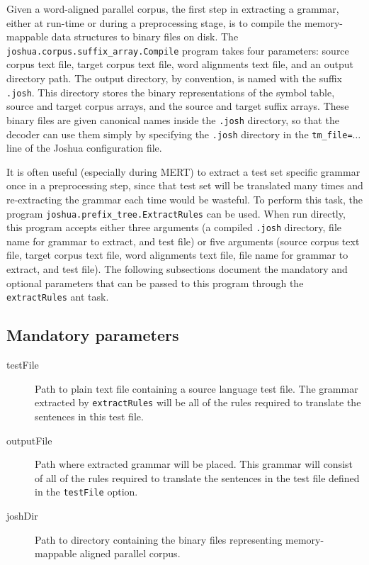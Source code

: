 \documentclass{pbml}
\begin{document}
Given a word-aligned parallel corpus, the first step in extracting a grammar, either at run-time or during a preprocessing stage, is to compile the memory-mappable data structures to binary files on disk. The {\tt joshua.corpus.suffix\_array.Compile} program takes four parameters: source corpus text file, target corpus text file, word alignments text file, and an output directory path. 
The output directory, by convention, is named with the suffix {\tt {\tt .josh}}. This directory stores the binary representations of the symbol table, source and target corpus arrays, and the source and target suffix arrays. 
%
These binary files are given canonical names inside the {\tt {\tt .josh}} directory, so that the decoder can use them simply by specifying the {\tt .josh} directory in the {\tt tm\_file=$\ldots$} line of the Joshua configuration file. 

It is often useful (especially during MERT) to extract a test set specific grammar once in a preprocessing step, since that test set will be translated many times and re-extracting the grammar each time would be wasteful. To perform this task, the program {\tt joshua.prefix\_tree.ExtractRules} can be used. When run directly, this program accepts either three arguments (a compiled {\tt .josh} directory, file name for grammar to extract, and test file) or five arguments (source corpus text file, target corpus text file, word alignments text file, file name for grammar to extract, and test file). 
The following subsections document the mandatory and optional parameters that can be passed to this program through the {\tt extractRules} ant task.

\subsection{Mandatory parameters}
\begin{description}

	\item[testFile] Path to plain text file containing a source language test file. The grammar extracted by {\tt extractRules} will be all of the rules required to translate the sentences in this test file.

	\item[outputFile] Path where extracted grammar will be placed. This grammar will consist of all of the rules required to translate the sentences in the test file defined in the {\tt testFile} option.

	\item[joshDir] Path to directory containing the binary files representing memory-mappable aligned parallel corpus.

\end{description}
\end{document}
